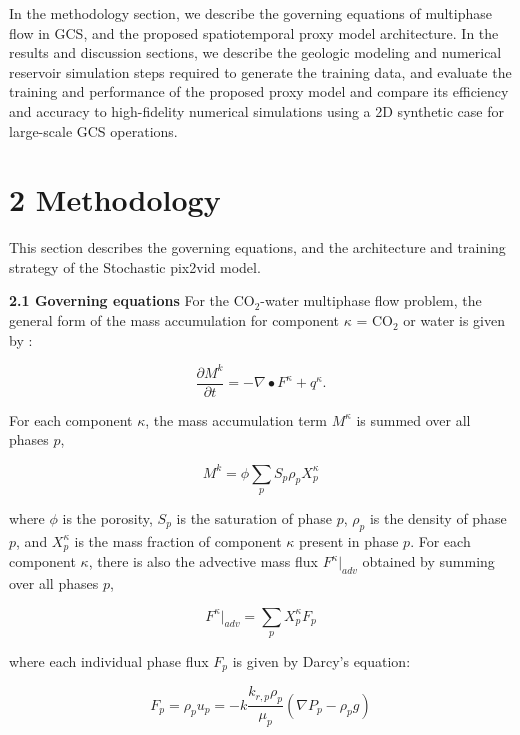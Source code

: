 \documentclass[10pt, twoside]{article}
\begin{document}
In the methodology section, we describe the governing equations of multiphase flow in GCS, and the proposed spatiotemporal proxy model architecture. In the results and discussion sections, we describe the geologic modeling and numerical reservoir simulation steps required to generate the training data, and evaluate the training and performance of the proposed proxy model and compare its efficiency and accuracy to high-fidelity numerical simulations using a 2D synthetic case for large-scale GCS operations. 

\section*{\textbf{2 Methodology}}
This section describes the governing equations, and the architecture and training strategy of the Stochastic pix2vid model.

\textbf{2.1 Governing equations} 
For the CO$_2$-water multiphase flow problem, the general form of the mass accumulation for component $\kappa$ = CO$_2$ or water is given by \cite{pruess1999tough2}:

\begin{equation} \label{eq1}
    \frac{\partial M^k}{\partial t} = -\nabla \bullet F^\kappa + q^\kappa .
\end{equation}

For each component $\kappa$, the mass accumulation term $M^\kappa$ is summed over all phases $p$,

\begin{equation} \label{eq2}
    M^k = \phi \sum_p S_p \rho_p X_p^\kappa
\end{equation}

where $\phi$ is the porosity, $S_p$ is the saturation of phase $p$, $\rho_p$ is the density of phase $p$, and $X_p^\kappa$ is the mass fraction of component $\kappa$ present in phase $p$. For each component $\kappa$, there is also the advective mass flux $F^\kappa \rvert_{adv}$ obtained by summing over all phases $p$, 

\begin{equation} \label{eq3}
    F^\kappa \rvert_{adv} = \sum_p X_p^\kappa F_p
\end{equation}

where each individual phase flux $F_p$ is given by Darcy's equation:

\begin{equation} \label{eq4}
    F_p = \rho_p u_p = -k \frac{k_{r,p} \rho_p}{\mu_p} (\nabla P_p - \rho_p g)
\end{equation}
\end{document}
